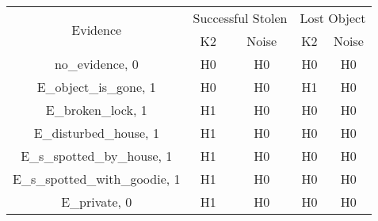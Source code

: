 \begin{table}\begin{tabular}{c|cc|cc}\toprule\multirow{2}{*}{Evidence} & \multicolumn{2}{c}{Successful Stolen} & \multicolumn{2}{c}{Lost Object} \\& {K2} & {Noise} & {K2} & {Noise} \\\midrule
no\_evidence, 0 & H0&H0&H0&H0\\E\_object\_is\_gone, 1 & H0&H0&\cellcolor{Bittersweet}H1&\cellcolor{Bittersweet}H0\\E\_broken\_lock, 1 & \cellcolor{Bittersweet}H1&\cellcolor{Bittersweet}H0&H0&H0\\E\_disturbed\_house, 1 & \cellcolor{Bittersweet}H1&\cellcolor{Bittersweet}H0&H0&H0\\E\_s\_spotted\_by\_house, 1 & \cellcolor{Bittersweet}H1&\cellcolor{Bittersweet}H0&H0&H0\\E\_s\_spotted\_with\_goodie, 1 & \cellcolor{Bittersweet}H1&\cellcolor{Bittersweet}H0&H0&H0\\E\_private, 0 & \cellcolor{Bittersweet}H1&\cellcolor{Bittersweet}H0&H0&H0\\\bottomrule\end{tabular}\end{table}